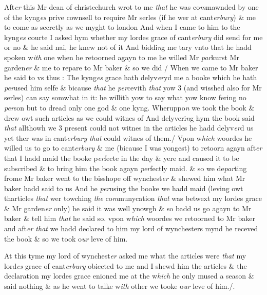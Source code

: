 \documentclass[12pt, a4paper]{book}
\begin{document}
		\ifthenelse{\isodd{\thepage}}
		{\reversemarginpar}
		{\normalmarginpar}
		Aft\textit{er} this Mr dean of christechurch wrot to me \textit{that }he was co\textit{m}mawnded
by one of the kyng\textit{es} prive cownsell to require Mr serles (if he wer
at cant\textit{erbury}) \& me to come as secretly as we myght to london And 
when I came to him to the kyng\textit{es} courte I asked hym whether my 
lordes grace of cant\textit{erbury} did send for me or no \& he said nai, he knew 
not of it And biddi\textit{n}g me tary vnto that he hadd spoken w\textit{ith} one
	when he retoorned agayn to me he willed Mr \textit{par}kurst Mr garden\textit{er} \& me 
to repare to Mr baker \& so we did / When we came to Mr baker he
said to vs thus : The kyng\textit{es} grace hath delyv\textit{er}yd me a booke which
he hath \textit{per}used him selfe \& bicause \textit{that} he \textit{per}cevith \textit{that} yow 3 (and 
wisshed also for Mr serles) can say somwhat in it: he willith yow 
			to
say what yow know fering no\textit{ per}son but to dread only one god
\& one kyng. Wheruppo\textit{n} we took the book \& drew owt such articles
as we could witnes of And delyveri\textit{n}g hym the book said \textit{that} allthowh
we 3 present could not witnes in the articles he hadd delyv\textit{er}d
us yet ther was in cant\textit{erbury}
               \textit{that} could witnes of them./ Vpon w\textit{hich} woordes
he willed us to go to cant\textit{erbury} \& me (bicause I was yongest) to retoorn
agayn aft\textit{er} that I hadd maid the booke p\textit{er}fecte in the day \& yere and 
caused it to be subscribed \& to bring him the book agayn \textit{per}fectly
	maid. \& so we de\textit{par}ting frome Mr baker went to the bisshope off
wynchest\textit{er} \& shewed him what Mr baker hadd said to us And he \textit{per}using
the booke we hadd maid (leving owt tharticles \textit{that} wer towching 
	\textit{the }co\textit{m}munycation \textit{that} was betwext my lordes grace \& Mr garden\textit{er} only)
he said it was well ynowgh \& so badd us go agayn to Mr baker \&
tell him \textit{that}
               \textit{} he said so. vpon w\textit{hich} woordes we retoorned to Mr baker and
	aft\textit{er that} we hadd declared to him my lord of wynchesters mynd he
receved the book \& so we took o\textit{ur} leve of him. 

 	
		\ifthenelse{\isodd{\thepage}}
		{\reversemarginpar}
		{\normalmarginpar}
		At this tyme my lord of wynchest\textit{er} asked me what the articles were
 		\textit{that} my lord\textit{es} grace of cant\textit{erbury} obiected to me and I shewd him the articles
 		\& the declaration my lordes grace enioned me at the w\textit{hich} he only 
mused a season \& said nothing \& as he went to talke w\textit{ith} other we
tooke o\textit{ur} leve of him./.
\end{document}
